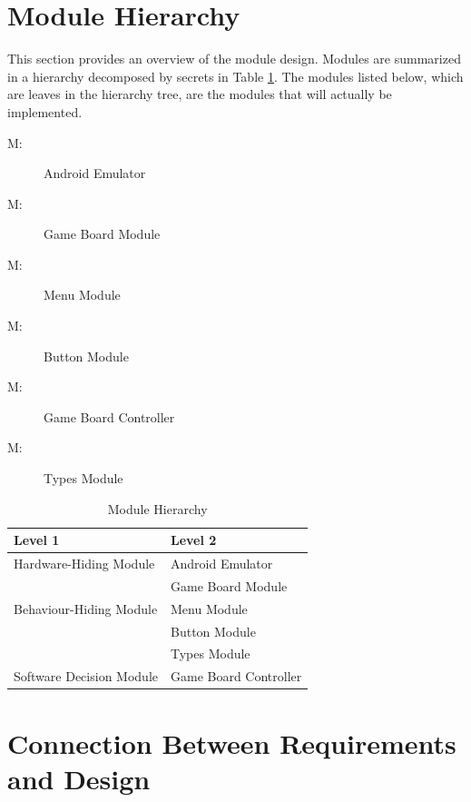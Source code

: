\documentclass[12pt, titlepage]{article}
\newcounter{mnum}
\newcommand{\mthemnum}{M\themnum}
\begin{document}
\section{Module Hierarchy} \label{SecMH}

This section provides an overview of the module design. Modules are summarized
in a hierarchy decomposed by secrets in Table \ref{TblMH}. The modules listed
below, which are leaves in the hierarchy tree, are the modules that will
actually be implemented.

\begin{description}
\item [ \mthemnum \label{m1}:] Android Emulator
\item [ \mthemnum \label{m2}:] Game Board Module
\item [ \mthemnum \label{m3}:] Menu Module
\item [ \mthemnum \label{m4}:] Button Module
\item [ \mthemnum \label{m5}:] Game Board Controller
\item [ \mthemnum \label{m6}:] Types Module

\end{description}


\begin{table}[H]
\centering
\begin{tabular}{p{} p{}}
\toprule
\textbf{Level 1} & \textbf{Level 2}\\
\midrule

{Hardware-Hiding Module} & Android Emulator \\
\midrule

\multirow{3}{0.3\textwidth}{Behaviour-Hiding Module} & Game Board Module\\
& Menu Module \\
& Button Module \\
& Types Module \\
\midrule

{Software Decision Module} & Game Board Controller\\
\bottomrule

\end{tabular}
\caption{Module Hierarchy}
\label{TblMH}
\end{table}

\section{Connection Between Requirements and Design} \label{SecConnection}
\end{document}
